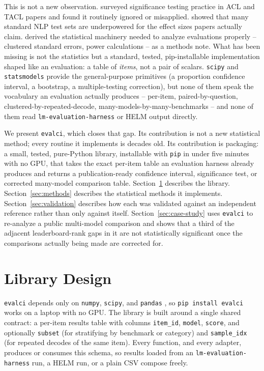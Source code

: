 \documentclass[11pt]{article}
\begin{document}
This is not a new observation. \citet{dror2018} surveyed significance testing
practice in ACL and TACL papers and found it routinely ignored or misapplied.
\citet{card2020} showed that many standard NLP test sets are underpowered for
the effect sizes papers actually claim. \citet{miller2024} derived the
statistical machinery needed to analyze evaluations properly -- clustered
standard errors, power calculations -- as a methods note. What has been
missing is not the statistics but a standard, tested, pip-installable
implementation shaped like an evaluation: a table of \emph{items}, not a pair
of scalars. \texttt{scipy} and \texttt{statsmodels} provide the general-purpose
primitives (a proportion confidence interval, a bootstrap, a multiple-testing
correction), but none of them speak the vocabulary an evaluation actually
produces -- per-item, paired-by-question, clustered-by-repeated-decode,
many-models-by-many-benchmarks -- and none of them read
\texttt{lm-evaluation-harness} or HELM output directly.

We present \texttt{evalci}, which closes that gap. Its contribution is not a
new statistical method; every routine it implements is decades old. Its
contribution is packaging: a small, tested, pure-Python library, installable
with \texttt{pip} in under five minutes with no GPU, that takes the exact
per-item table an evaluation harness already produces and returns a
publication-ready confidence interval, significance test, or corrected
many-model comparison table. Section~\ref{sec:design} describes the library.
Section~\ref{sec:methods} describes the statistical methods it implements.
Section~\ref{sec:validation} describes how each was validated against an
independent reference rather than only against itself. Section~\ref{sec:case-study}
uses \texttt{evalci} to re-analyze a public multi-model comparison and shows
that a third of the adjacent leaderboard-rank gaps in it are not statistically
significant once the comparisons actually being made are corrected for.

\section{Library Design}
\label{sec:design}

\texttt{evalci} depends only on \texttt{numpy}, \texttt{scipy}, and
\texttt{pandas} \citep{harris2020numpy,virtanen2020scipy,mckinney2010pandas},
so \texttt{pip install evalci} works on a laptop with no GPU. The library is
built around a single shared contract: a per-item results table with columns
\texttt{item\_id}, \texttt{model}, \texttt{score}, and optionally
\texttt{subset} (for stratifying by benchmark or category) and
\texttt{sample\_idx} (for repeated decodes of the same item). Every function,
and every adapter, produces or consumes this schema, so results loaded from an
\texttt{lm-evaluation-harness} run, a HELM run, or a plain CSV compose freely.
\end{document}
